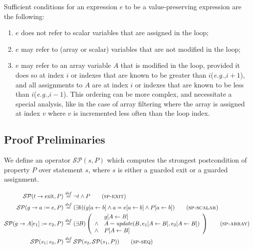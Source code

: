 \documentclass[a4paper,10pt]{article}
\newcommand{\eg}{\textit{e.g.,}\xspace}
\newcommand{\idx}{\ensuremath{i}\xspace}
\newcommand{\KWexit}{\ensuremath{\mathrm{exit}}}
\newcommand{\update}[3]{\ensuremath{\mathit{update}{(#1,#2,#3)}}\xspace}
\newcommand{\symdef}{\ensuremath{\overset{\mathit{def}}{=}}}
\newcommand{\spexit}{\textsc{sp-exit}\xspace}
\newcommand{\spscalar}{\textsc{sp-scalar}\xspace}
\newcommand{\sparray}{\textsc{sp-array}\xspace}
\newcommand{\spseq}{\textsc{sp-seq}\xspace}
\begin{document}
Sufficient conditions for an expression $e$ to be a value-preserving expression
are the following:
\begin{enumerate}
\item $e$ does not refer to scalar variables that are assigned in the loop;
\item $e$ may refer to (array or scalar) variables that are not modified in the loop;
\item $e$ may refer to an array variable $A$ that is modified in the loop,
  provided it does so at index \idx or indexes that are known to be greater
  than \idx (\eg $\idx + 1$), and all assignments to $A$ are at index \idx or
  indexes that are known to be less than \idx (\eg $\idx - 1$). This ordering
  can be more complex, and necessitate a special analysis, like in the case of
  array filtering where the array is assigned at index $v$ where $v$ is
  incremented less often than the loop index.
\end{enumerate}

\subsection{Proof Preliminaries}

\newcommand{\spostsym}{\ensuremath{\mathcal{SP}}\xspace}
\newcommand{\spost}[2]{\ensuremath{\spostsym(#1,#2)}}
\newcommand{\subst}[3]{\ensuremath{#1[#2 \leftarrow #3]}}

We define an operator \spost{s}{P} which computes the strongest postcondition of
property $P$ over statement $s$, where $s$ is either a guarded
exit or a guarded assignment.

\begin{align*}
\spost{t \rightarrow \KWexit}{P} &\symdef \neg t \land P \tag{\spexit}\\
\spost{g \rightarrow a:=e}{P} &\symdef (\exists b) (\subst{g}{a}{b} 
    \land a = \subst{e}{a}{b} \land \subst{P}{a}{b}) \tag{\spscalar}\\
\spost{g \rightarrow A[e_1]:=e_2}{P} &\symdef (\exists B)
\left(\begin{array}{cl}
&\subst{g}{A}{B}\\
\land& A = \update{B}{\subst{e_1}{A}{B}}{\subst{e_2}{A}{B}}\\
\land& \subst{P}{A}{B}\\
\end{array}\right)
 \tag{\sparray}\\
\spost{s_1; s_2}{P} &\symdef \spost{s_2}{\spost{s_1}{P}} \tag{\spseq}
\end{align*}
\end{document}

